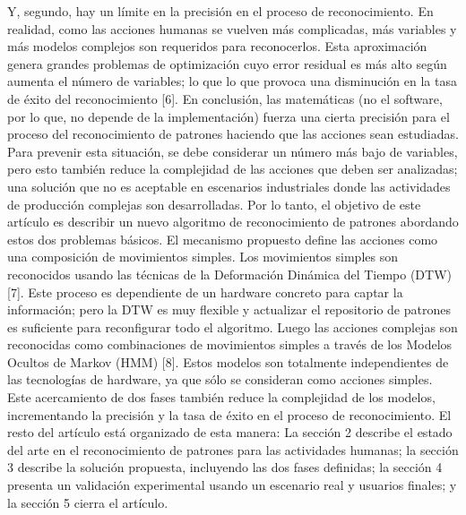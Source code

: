 \documentclass[a4paper]{article}
\begin{document}
Y, segundo, hay un límite en la precisión en el proceso de reconocimiento. En realidad, como las acciones humanas se vuelven más complicadas, más variables y más modelos complejos son requeridos para reconocerlos. Esta aproximación genera grandes problemas de optimización cuyo error residual es más alto según aumenta el número de variables; lo que lo que provoca una disminución en la tasa de éxito del reconocimiento [6]. En conclusión, las matemáticas (no el software, por lo que, no depende de la implementación) fuerza una cierta precisión para el proceso del reconocimiento de patrones haciendo que las acciones sean estudiadas. Para prevenir esta situación, se debe considerar un número más bajo de variables, pero esto también reduce la complejidad de las acciones que deben ser analizadas; una solución que no es aceptable en escenarios industriales donde las actividades de producción complejas son desarrolladas.
Por lo tanto, el objetivo de este artículo es describir un nuevo algoritmo de reconocimiento de patrones abordando estos dos problemas básicos. El mecanismo propuesto define las acciones como una composición de movimientos simples. Los movimientos simples son reconocidos usando las técnicas de la Deformación Dinámica del Tiempo (DTW) [7]. Este proceso es dependiente de un hardware concreto para captar la información; pero la DTW es muy flexible y actualizar el repositorio de patrones es suficiente para reconfigurar todo el algoritmo. Luego las acciones complejas son reconocidas como combinaciones de movimientos simples a través de los Modelos Ocultos de Markov (HMM) [8]. Estos modelos son totalmente independientes de las tecnologías de hardware, ya que sólo se consideran como acciones simples. Este acercamiento de dos fases también reduce la complejidad de los modelos, incrementando la precisión y la tasa de éxito en el proceso de reconocimiento.
El resto del artículo está organizado de esta manera: La sección 2 describe el estado del arte en el reconocimiento de patrones para las actividades humanas; la sección 3 describe la solución propuesta, incluyendo las dos fases definidas; la sección 4 presenta un validación experimental usando un escenario real y usuarios finales; y la sección 5 cierra el artículo. 
\end{document}
